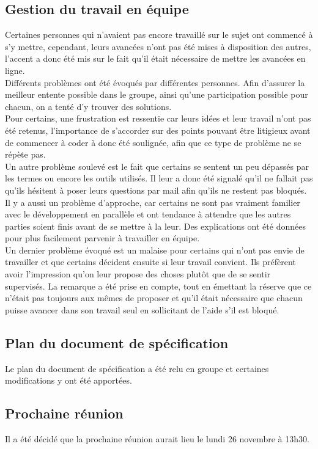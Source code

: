 \documentclass{article}
\begin{document}
\subsection*{Gestion du travail en équipe}
Certaines personnes qui n'avaient pas encore travaillé sur le sujet ont
commencé à s'y mettre, cependant, leurs avancées n'ont pas été mises à
disposition des autres, l'accent a donc été mis sur le fait qu'il était
nécessaire de mettre les avancées en ligne.\\
Différents problèmes ont été évoqués par différentes personnes. Afin
d'assurer la meilleur entente possible dans le groupe, ainsi qu'une
participation possible pour chacun, on a tenté d'y trouver des solutions.\\
Pour certains, une frustration est ressentie car leurs idées et leur travail
n'ont pas été retenus, l'importance de s'accorder sur des points pouvant
être litigieux avant de commencer à coder à donc été soulignée, afin que ce
type de problème ne se répète pas.\\
Un autre problème soulevé est le fait que certains se sentent un peu dépassés
par les termes ou encore les outils utilisés. Il leur a donc été signalé
qu'il ne fallait pas qu'ils hésitent à poser leurs questions par mail afin
qu'ils ne restent pas bloqués.\\
Il y a aussi un problème d'approche, car certains ne sont
pas vraiment familier avec le développement en parallèle et ont tendance à
attendre que les autres parties soient finis avant de se mettre à la leur.
Des explications ont été données pour plus facilement parvenir à travailler
en équipe.\\
Un dernier problème évoqué est un malaise pour certains qui n'ont pas envie
de travailler et que certains décident ensuite si leur travail convient. Ils
préfèrent avoir l'impression qu'on leur propose des choses plutôt que de se
sentir supervisés. La remarque a été prise en compte, tout en émettant la
réserve que ce n'était pas toujours aux mêmes de proposer et qu'il était
nécessaire que chacun puisse avancer dans son travail seul en sollicitant de
l'aide s'il est bloqué.

\subsection*{Plan du document de spécification}
Le plan du document de spécification a été relu en groupe et certaines
modifications y ont été apportées.

\subsection*{Prochaine réunion}
Il a été décidé que la prochaine réunion aurait lieu le lundi 26 novembre à 13h30.
\end{document}
